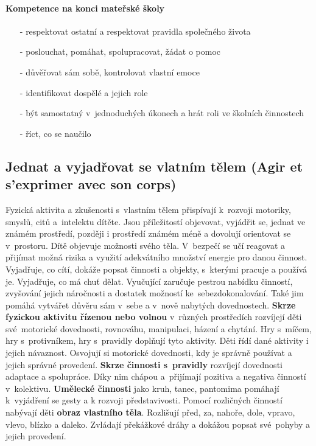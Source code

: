 			\paragraph{Kompetence na konci mateřské školy}
			\begin{itemize}
				\setlength\itemsep{-2mm}
				\item[-] respektovat ostatní a respektovat pravidla společného života
				\item[-] poslouchat, pomáhat, spolupracovat, žádat o pomoc
				\item[-] důvěřovat sám sobě, kontrolovat vlastní emoce
				\item[-] identifikovat dospělé a jejich role
				\item[-] být samostatný v jednoduchých úkonech a hrát roli ve školních činnostech
				\item[-] říct, co se naučilo
				\end{itemize}

		\subsection{Jednat a vyjadřovat se vlatním tělem (Agir et s'exprimer avec son corps)}
			Fyzická aktivita a zkušenosti s vlastním tělem přispívají k rozvoji motoriky, smyslů, citů a intelektu dítěte. Jsou příležitostí objevovat, vyjádřit se, jednat ve známém prostředí, později i prostředí známém méně a dovolují orientovat se v prostoru. Dítě objevuje možnosti svého těla. V bezpečí se učí reagovat a přijímat možná rizika a využití adekvátního množství energie pro danou činnost. Vyjadřuje, co cítí, dokáže popsat činnosti a objekty, s kterými pracuje a používá je. Vyjadřuje, co má chuť dělat. Vyučující zaručuje  pestrou nabídku činností, zvyšování jejich náročnosti a dostatek možností ke sebezdokonalování. Také jim pomáhá vytvářet důvěru sám v sebe a v nově nabytých dovednostech. 
			\textbf{Skrze fyzickou aktivitu řízenou nebo volnou} v různých prostředích rozvíjejí děti své motorické dovednosti, rovnováhu, manipulaci, házení a chytání. Hry s míčem, hry s protivníkem, hry s pravidly doplňují tyto aktivity. Děti řídí dané aktivity i jejich návaznost. Osvojují si motorické dovednosti, kdy je správně používat a jejich správné provedení. 
			\textbf{Skrze činnosti s pravidly} rozvíjejí dovednosti adaptace a spolupráce. Díky nim chápou a přijímají pozitiva a negativa činností v kolektivu. 
			\textbf{Umělecké činnosti} jako kruh, tanec, pantomima pomáhají k vyjádření se gesty a k rozvoji představivosti.
			Pomocí rozličných činností nabývají děti \textbf{obraz vlastního těla}. Rozlišují před, za, nahoře, dole, vpravo, vlevo, blízko a daleko. Zvládají překážkové dráhy a dokážou popsat své pohyby a jejich provedení.
